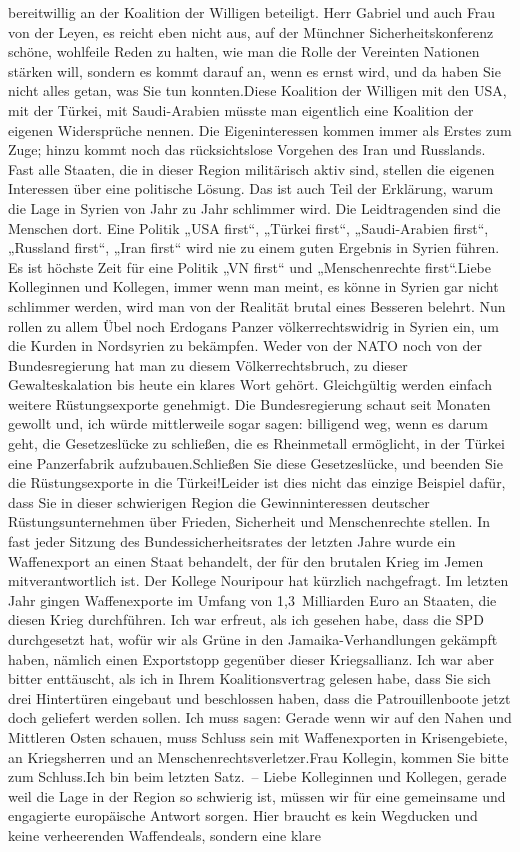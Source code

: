 \documentclass{article}
\begin{document}
bereitwillig an der Koalition der Willigen beteiligt. Herr Gabriel und auch Frau von der Leyen, es reicht eben nicht aus, auf der Münchner Sicherheitskonferenz schöne, wohlfeile Reden zu halten, wie man die Rolle der Vereinten Nationen stärken will, sondern es kommt darauf an, wenn es ernst wird, und da haben Sie nicht alles getan, was Sie tun konnten.Diese Koalition der Willigen mit den USA, mit der Türkei, mit Saudi-Arabien müsste man eigentlich eine Koalition der eigenen Widersprüche nennen. Die Eigeninteressen kommen immer als Erstes zum Zuge; hinzu kommt noch das rücksichtslose Vorgehen des Iran und Russlands. Fast alle Staaten, die in dieser Region militärisch aktiv sind, stellen die eigenen Interessen über eine politische Lösung. Das ist auch Teil der Erklärung, warum die Lage in Syrien von Jahr zu Jahr schlimmer wird. Die Leidtragenden sind die Menschen dort. Eine Politik „USA first“, „Türkei first“, „Saudi-Arabien first“, „Russland first“, „Iran first“ wird nie zu einem guten Ergebnis in Syrien führen. Es ist höchste Zeit für eine Politik „VN first“ und „Menschenrechte first“.Liebe Kolleginnen und Kollegen, immer wenn man meint, es könne in Syrien gar nicht schlimmer werden, wird man von der Realität brutal eines Besseren belehrt. Nun rollen zu allem Übel noch Erdogans Panzer völkerrechtswidrig in Syrien ein, um die Kurden in Nordsyrien zu bekämpfen. Weder von der NATO noch von der Bundesregierung hat man zu diesem Völkerrechtsbruch, zu dieser Gewalteskalation bis heute ein klares Wort gehört. Gleichgültig werden einfach weitere Rüstungsexporte genehmigt. Die Bundesregierung schaut seit Monaten gewollt und, ich würde mittlerweile sogar sagen: billigend weg, wenn es darum geht, die Gesetzeslücke zu schließen, die es Rheinmetall ermöglicht, in der Türkei eine Panzerfabrik aufzubauen.Schließen Sie diese Gesetzeslücke, und beenden Sie die Rüstungsexporte in die Türkei!Leider ist dies nicht das einzige Beispiel dafür, dass Sie in dieser schwierigen Region die Gewinninteressen deutscher Rüstungsunternehmen über Frieden, Sicherheit und Menschenrechte stellen. In fast jeder Sitzung des Bundessicherheitsrates der letzten Jahre wurde ein Waffenexport an einen Staat behandelt, der für den brutalen Krieg im Jemen mitverantwortlich ist. Der Kollege Nouripour hat kürzlich nachgefragt. Im letzten Jahr gingen Waffenexporte im Umfang von 1,3 Milliarden Euro an Staaten, die diesen Krieg durchführen. Ich war erfreut, als ich gesehen habe, dass die SPD durchgesetzt hat, wofür wir als Grüne in den Jamaika-Verhandlungen gekämpft haben, nämlich einen Exportstopp gegenüber dieser Kriegsallianz. Ich war aber bitter enttäuscht, als ich in Ihrem Koalitionsvertrag gelesen habe, dass Sie sich drei Hintertüren eingebaut und beschlossen haben, dass die Patrouillenboote jetzt doch geliefert werden sollen. Ich muss sagen: Gerade wenn wir auf den Nahen und Mittleren Osten schauen, muss Schluss sein mit Waffenexporten in Krisengebiete, an Kriegsherren und an Menschenrechtsverletzer.Frau Kollegin, kommen Sie bitte zum Schluss.Ich bin beim letzten Satz. – Liebe Kolleginnen und Kollegen, gerade weil die Lage in der Region so schwierig ist, müssen wir für eine gemeinsame und engagierte europäische Antwort sorgen. Hier braucht es kein Wegducken und keine verheerenden Waffendeals, sondern eine klare 
\end{document}
